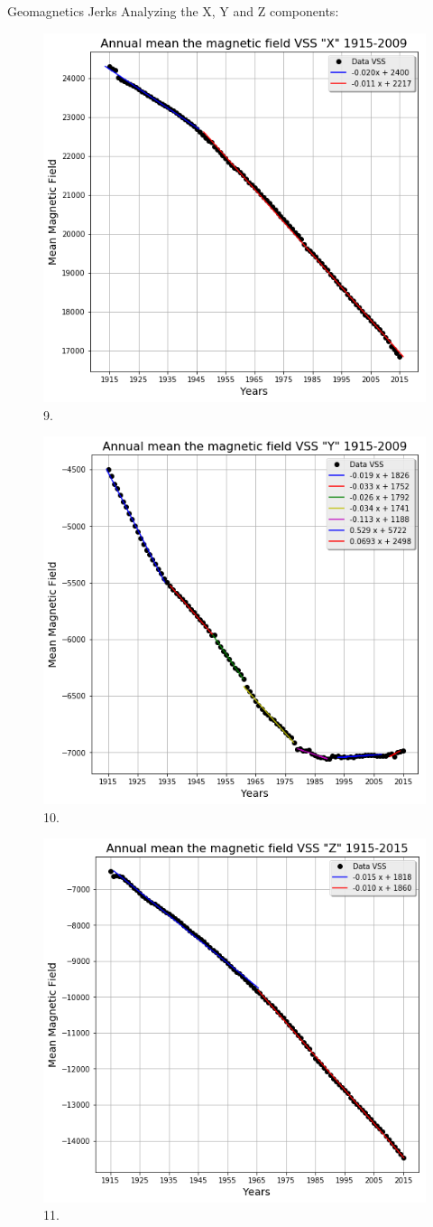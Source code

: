 \documentclass[final,t]{beamer}
\begin{document}
\begin{columns}[t]
\begin{column}{.66\linewidth}
\begin{columns}
\begin{column}{.31\linewidth}
\begin{block}{Geomagnetics Jerks}
		Analyzing the X, Y and Z components:	
		\begin{figure}
			\centering
			\includegraphics[width=0.6\linewidth]{retasX}
			\caption{9.}
			\label{w}
		\end{figure}	
		
		\begin{figure}
			\centering
			\includegraphics[width=0.6\linewidth]{retasY}
			\caption{10.}
			\label{fintetico}
		\end{figure}	
		
		
		\begin{figure}
			\centering
			\includegraphics[width=0.6\linewidth]{retasZ}
			\caption{11.}
			\label{fig:g_Sintetico}
		\end{figure}


\end{block}
\end{column}
\end{columns}
\end{column}
\end{columns}
\end{document}
